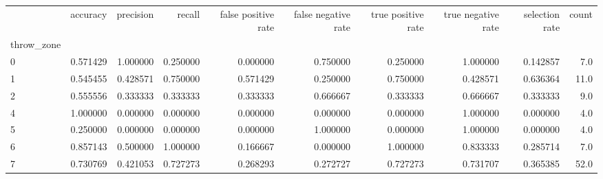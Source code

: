 \begin{tabular}{lrrrrrrrrr}
\toprule
{} &  accuracy &  precision &    recall &  false positive rate &  false negative rate &  true positive rate &  true negative rate &  selection rate &  count \\
throw\_zone &           &            &           &                      &                      &                     &                     &                 &        \\
\midrule
0          &  0.571429 &   1.000000 &  0.250000 &             0.000000 &             0.750000 &            0.250000 &            1.000000 &        0.142857 &    7.0 \\
1          &  0.545455 &   0.428571 &  0.750000 &             0.571429 &             0.250000 &            0.750000 &            0.428571 &        0.636364 &   11.0 \\
2          &  0.555556 &   0.333333 &  0.333333 &             0.333333 &             0.666667 &            0.333333 &            0.666667 &        0.333333 &    9.0 \\
4          &  1.000000 &   0.000000 &  0.000000 &             0.000000 &             0.000000 &            0.000000 &            1.000000 &        0.000000 &    4.0 \\
5          &  0.250000 &   0.000000 &  0.000000 &             0.000000 &             1.000000 &            0.000000 &            1.000000 &        0.000000 &    4.0 \\
6          &  0.857143 &   0.500000 &  1.000000 &             0.166667 &             0.000000 &            1.000000 &            0.833333 &        0.285714 &    7.0 \\
7          &  0.730769 &   0.421053 &  0.727273 &             0.268293 &             0.272727 &            0.727273 &            0.731707 &        0.365385 &   52.0 \\
\bottomrule
\end{tabular}
